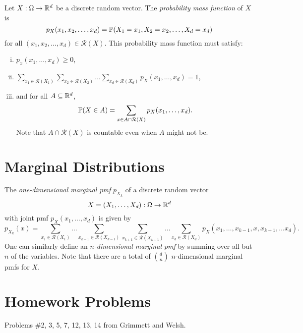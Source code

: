 \begin{definition}
  Let $X : \Omega \to \mathbb{R}^d$ be a discrete random
  vector. The \emph{probability mass function} of $X$
  is
  \[
    p_X(x_1, x_2, \dots, x_d) = \mathbb{P}(X_1 = x_1, X_2 = x_2, \dots, X_d = x_d)
  \]
  for all $(x_1, x_2, \dots, x_d) \in \mathcal{R}(X)$.
  This probability mass function must satisfy:
  \begin{enumerate}[(i)]
    \item $p_x(x_1, \dots, x_d) \ge 0$,
    \item $\displaystyle \sum_{x_1 \in \mathcal{R}(X_1)} \sum_{x_2 \in \mathcal{R}(X_2)} \dots \sum_{x_d \in \mathcal{R}(X_d)} p_X(x_1, \dots, x_d) = 1$,
    \item and for all $A \subseteq \mathbb{R}^d$,
      \[
        \mathbb{P}(X \in A)
        = \sum_{x \in A \cap \mathcal{R}(X)}
        p_X(x_1, \dots, x_d).
      \]
      Note that $A \cap \mathcal{R}(X)$ is countable
      even when $A$ might not be.
  \end{enumerate}
\end{definition}

\section{Marginal Distributions}
\begin{definition}
  The \emph{one-dimensional marginal pmf}
  $p_{X_k}$
  of a discrete random vector
  \[X = (X_1, \dots, X_d) : \Omega \to \mathbb{R}^d\]
  with joint pmf $p_X(x_1, \dots, x_d)$
  is given by
  \[
    p_{X_k}(x) = \sum_{x_1 \in \mathcal{R}(X_1)} \dots \sum_{x_{k-1} \in \mathcal{R}(X_{k-1})} \sum_{x_{k+1} \in \mathcal{R}(X_{k+1})} \dots \sum_{x_d \in \mathcal{R}(X_d)} p_X(x_1, \dots, x_{k - 1}, x, x_{k + 1}, \dots x_d).
  \]
  One can similarly define an \emph{$n$-dimensional marginal pmf}
  by summing over all but $n$ of the variables.
  Note that there are a total of $\binom{d}{n}$
  $n$-dimensional marginal pmfs for $X$.
\end{definition}

\section{Homework Problems}
Problems \#2, 3, 5, 7, 12, 13, 14 from
Grimmett and Welsh.
